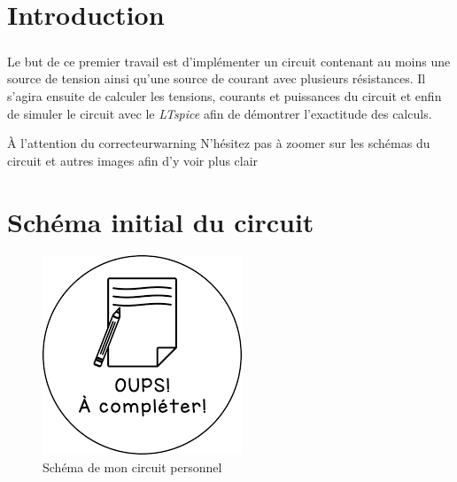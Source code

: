 \section{Introduction}

    \subparagraph{}Le but de ce {\color{info}premier travail} est d'implémenter un circuit contenant au moins une source de tension ainsi qu'une source de courant avec 
    plusieurs résistances. Il s'agira ensuite de calculer les tensions, courants et puissances du circuit et enfin de simuler le circuit avec le \textit{LTspice}
    afin de démontrer l'exactitude des calculs.\\[1.5cm]
    
    \begin{titletbox}{À l'attention du correcteur}{warning}
        N'hésitez pas à zoomer sur les schémas du circuit et autres images afin d'y voir plus clair
    \end{titletbox}

\section{Schéma initial du circuit}

    \begin{figure}[H]
        \centering
        \includegraphics[scale=0.5]{../pictures/blank.png} %
        \caption{Schéma de mon circuit personnel}
    \end{figure}

